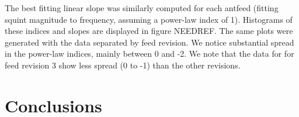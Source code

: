 \documentclass[preprint]{aastex}
\begin{document}
The best fitting linear slope was similarly computed for each antfeed
(fitting squint magnitude to frequency, assuming a power-law index of
1).  Histograms of these indices and slopes are displayed in figure
NEEDREF.  The same plots were generated with the data separated by
feed revision.  We notice substantial spread in the power-law indices,
mainly between 0 and -2.  We note that the data for for feed revision
3 show less spread (0 to -1) than the other revisions.

\section{Conclusions}\label{s.conclusions}




\end{document}
